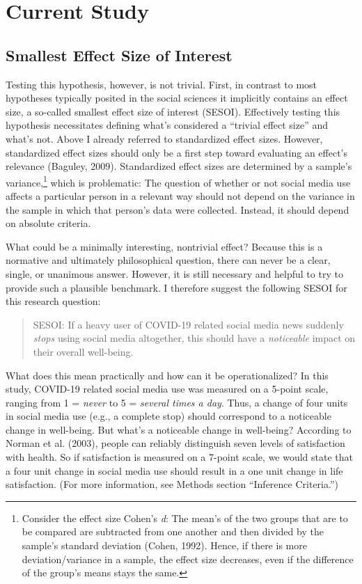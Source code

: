 \documentclass[
  man,mask]{apa7}
\begin{document}
\hypertarget{current-study}{%
\section{Current Study}\label{current-study}}

\hypertarget{smallest-effect-size-of-interest}{%
\subsection{Smallest Effect Size of Interest}\label{smallest-effect-size-of-interest}}

Testing this hypothesis, however, is not trivial.
First, in contrast to most hypotheses typically posited in the social sciences it implicitly contains an effect size, a so-called smallest effect size of interest (SESOI).
Effectively testing this hypothesis necessitates defining what's considered a ``trivial effect size'' and what's not.
Above I already referred to standardized effect sizes.
However, standardized effect sizes should only be a first step toward evaluating an effect's relevance (Baguley, 2009).
Standardized effect sizes are determined by a sample's variance,\footnote{Consider the effect size Cohen's \emph{d}: The mean's of the two groups that are to be compared are subtracted from one another and then divided by the sample's standard deviation (Cohen, 1992). Hence, if there is more deviation/variance in a sample, the effect size decreases, even if the difference of the group's means stays the same.} which is problematic:
The question of whether or not social media use affects a particular person in a relevant way should not depend on the variance in the sample in which that person's data were collected.
Instead, it should depend on absolute criteria.

What could be a minimally interesting, nontrivial effect?
Because this is a normative and ultimately philosophical question, there can never be a clear, single, or unanimous answer.
However, it is still necessary and helpful to try to provide such a plausible benchmark.
I therefore suggest the following SESOI for this research question:

\begin{quote}
SESOI: If a heavy user of COVID-19 related social media news suddenly \emph{stops} using social media altogether, this should have a \emph{noticeable} impact on their overall well-being.
\end{quote}

What does this mean practically and how can it be operationalized?
In this study, COVID-19 related social media use was measured on a 5-point scale, ranging from 1 = \emph{never} to 5 = \emph{several times a day}.
Thus, a change of four units in social media use (e.g., a complete stop) should correspond to a noticeable change in well-being.
But what's a noticeable change in well-being?
According to Norman et al. (2003), people can reliably distinguish seven levels of satisfaction with health.
So if satisfaction is measured on a 7-point scale, we would state that a four unit change in social media use should result in a one unit change in life satisfaction.
(For more information, see Methods section ``Inference Criteria.'')
\end{document}
